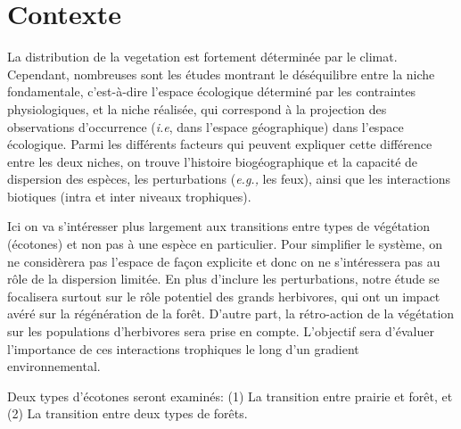 




\section{Contexte}

La distribution de la vegetation est fortement déterminée par le climat.
Cependant, nombreuses sont les études montrant le déséquilibre entre la niche
fondamentale, c'est-à-dire l'espace écologique déterminé par les contraintes
physiologiques, et la niche réalisée, qui correspond à la projection des
observations d'occurrence (\textit{i.e}, dans l'espace géographique) dans
l'espace écologique. Parmi les différents facteurs qui peuvent expliquer cette
différence entre les deux niches, on trouve l'histoire biogéographique et la
capacité de dispersion des espèces, les perturbations (\textit{e.g.,} les
feux), ainsi que les interactions biotiques (intra et inter niveaux
trophiques).

\vspace{1em}

Ici on va s'intéresser plus largement aux transitions entre types de
végétation (écotones) et non pas à une espèce en particulier. Pour simplifier
le système, on ne considèrera pas l'espace de façon explicite et donc on ne
s'intéressera pas au rôle de la dispersion limitée. En plus d'inclure les
perturbations, notre étude se focalisera surtout sur le rôle potentiel des
grands herbivores, qui ont un impact avéré sur la régénération de la forêt.
D'autre part, la rétro-action de la végétation sur les populations
d'herbivores sera prise en compte. L'objectif sera d'évaluer l'importance de
ces interactions trophiques le long d'un gradient environnemental.

\vspace{1em}

Deux types d'écotones seront examinés: (1) La transition entre prairie et
forêt, et (2) La transition entre deux types de forêts.



